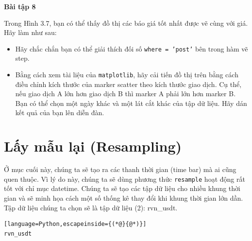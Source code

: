 
\textbf{Bài tập 8}

Trong Hình 3.7, bạn có thể thấy đồ thị các báo giá tốt nhất được vẽ cùng với giá. Hãy làm như sau:
\begin{itemize}
  \item Hãy chắc chắn bạn có thể giải thích đối số \texttt{where = 'post'} bên trong hàm vẽ step.
  \item Bằng cách xem tài liệu của \texttt{matplotlib}, hãy cải tiến đồ thị trên bằng cách điều chỉnh kích thước của marker scatter theo kích thước giao dịch. Cụ thể, nếu giao dịch A lớn hơn giao dịch B thì marker A phải lớn hơn marker B. Bạn có thể chọn một ngày khác và một lát cắt khác của tập dữ liệu. Hãy dán kết quả của bạn lên diễn đàn.
\end{itemize}

\section{Lấy mẫu lại (Resampling)}

Ở mục cuối này, chúng ta sẽ tạo ra các thanh thời gian (time bar) mà ai cũng quen thuộc. Vì lý do này, chúng ta sẽ dùng phương thức \texttt{resample} hoạt động rất tốt với chỉ mục datetime. Chúng ta sẽ tạo các tập dữ liệu cho nhiều khung thời gian và sẽ minh họa cách một số thống kê thay đổi khi khung thời gian lớn dần. Tập dữ liệu chúng ta chọn sẽ là tập dữ liệu (2): rvn\_usdt.

\begin{lstlisting}[language=Python,escapeinside={(*@}{@*)}]
rvn_usdt
\end{lstlisting}

